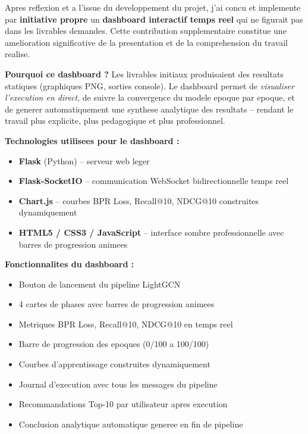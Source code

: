 \documentclass[12pt,a4paper]{report}
\begin{document}
\begin{tcolorbox}[enhanced,breakable,
  colback=enspyorange!8,colframe=enspyorange,
  fonttitle=\bfseries\color{white},
  colbacktitle=enspyorange,arc=4pt,boxrule=1pt,
  title={Innovation personnelle -- non prevue dans les livrables initiaux}]

Apres reflexion et a l'issue du developpement du projet, j'ai
concu et implemente par \textbf{initiative propre} un
\textbf{dashboard interactif temps reel} qui ne figurait pas
dans les livrables demandes. Cette contribution supplementaire
constitue une amelioration significative de la presentation
et de la comprehension du travail realise.

\medskip
\textbf{Pourquoi ce dashboard ?} Les livrables initiaux
produisaient des resultats statiques (graphiques PNG, sorties
console). Le dashboard permet de \textit{visualiser l'execution
en direct}, de suivre la convergence du modele epoque par epoque,
et de generer automatiquement une synthese analytique des
resultats -- rendant le travail plus explicite, plus pedagogique
et plus professionnel.

\medskip
\textbf{Technologies utilisees pour le dashboard :}
\begin{itemize}
  \item \textbf{Flask} (Python) -- serveur web leger
  \item \textbf{Flask-SocketIO} -- communication WebSocket
    bidirectionnelle temps reel
  \item \textbf{Chart.js} -- courbes BPR Loss, Recall@10,
    NDCG@10 construites dynamiquement
  \item \textbf{HTML5 / CSS3 / JavaScript} -- interface
    sombre professionnelle avec barres de progression animees
\end{itemize}

\medskip
\textbf{Fonctionnalites du dashboard :}
\begin{itemize}
  \item Bouton de lancement du pipeline LightGCN
  \item 4 cartes de phases avec barres de progression animees
  \item Metriques BPR Loss, Recall@10, NDCG@10 en temps reel
  \item Barre de progression des epoques (0/100 a 100/100)
  \item Courbes d'apprentissage construites dynamiquement
  \item Journal d'execution avec tous les messages du pipeline
  \item Recommandations Top-10 par utilisateur apres execution
  \item Conclusion analytique automatique generee en fin de pipeline
\end{itemize}
\end{tcolorbox}
\end{document}
